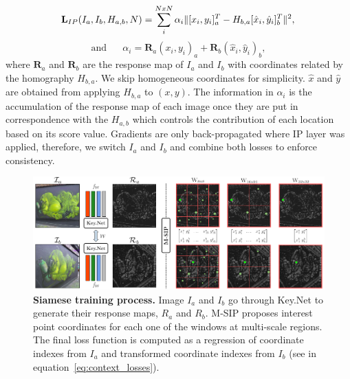 \begin{equation*}
\mathbf{L}_{IP}(I_a,I_b,H_{a,b}, N) = \sum_{\substack{i}}^{NxN} \alpha_i\| [{x_i}, {y_i}]^T_{a} - H_{b,a}[{\hat{x}_i}, {\hat{y}_i}]^T_{b}\|^2, \\
\end{equation*}
\begin{equation}
\textrm{and  } \textrm{ } \textrm{ } \alpha_i =  \mathbf{R}_{a}({x_i}, {y_i})_{a} + \mathbf{R}_{b}({\hat{x}_i}, {\hat{y}_i})_{b},
\label{eq:context_losses}
\end{equation}
where $\mathbf{R}_{a}$ and $\mathbf{R}_{b}$ are the response map of $I_a$ and $I_b$ with coordinates related by the homography $H_{b,a}$. We skip homogeneous coordinates for simplicity. $\hat{x}$ and $\hat{y}$ are obtained from applying $H_{b,a}$ to $(x,y)$. The information in $\alpha_{i}$ is the accumulation of the response map of each image once they are put in correspondence with the $H_{a,b}$ which controls the contribution of each location based on its score value. Gradients are only back-propagated where IP layer was applied, therefore, we switch $I_{a}$ and $I_{b}$ and combine both losses to enforce consistency.


\begin{figure}
    \centering
    \includegraphics[width=\linewidth]{main/chapter02/figures/training_v2.pdf}
    \vspace{-0.20cm}
    \caption[Siamese training process]{\textbf{Siamese training process.} Image $I_a$ and $I_b$ go through Key.Net to generate their response maps, $R_a$ and $R_b$. M-SIP proposes interest point coordinates for each one of the windows at multi-scale regions. The final loss function is computed as a regression of coordinate indexes from $I_a$ and transformed coordinate indexes from $I_b$ (see in equation~\ref{eq:context_losses}).}
    \label{keynet_fig:trainingfigure}
\end{figure}

